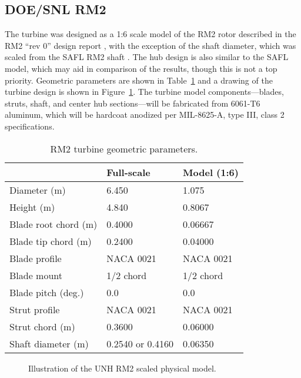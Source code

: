 \subsection{DOE/SNL RM2}

The turbine was designed as a 1:6 scale model of the RM2 rotor described in the
RM2 ``rev 0'' design report \cite{Barone2011}, with the exception of the shaft
diameter, which was scaled from the SAFL RM2 shaft \cite{Hill2014}. The hub
design is also similar to the SAFL model, which may aid in comparison of the
results, though this is not a top priority. Geometric parameters are shown in
Table~\ref{tab:turb-geom} and a drawing of the turbine design is shown in
Figure~\ref{fig:RM2-drawing}. The turbine model components---blades, struts,
shaft, and center hub sections---will be fabricated from 6061-T6 aluminum, which
will be hardcoat anodized per MIL-8625-A, type III, class 2 specifications.

\begin{table}[ht]
    \centering
    \begin{tabular}{l|l|l}
        & Full-scale & Model (1:6) \\
        \hline 
        Diameter (m)   & 6.450 & 1.075 \\ 
        Height (m)     & 4.840 & 0.8067 \\ 
        Blade root chord (m) & 0.4000 & 0.06667 \\ 
        Blade tip chord (m)  & 0.2400 & 0.04000 \\ 
        Blade profile & NACA 0021 & NACA 0021 \\ 
        Blade mount & 1/2 chord & 1/2 chord \\ 
        Blade pitch (deg.) & 0.0 & 0.0 \\ 
        Strut profile & NACA 0021 & NACA 0021 \\ 
        Strut chord (m) & 0.3600 & 0.06000 \\ 
        Shaft diameter (m) & 0.2540 \cite{Beam2011} or 0.4160 \cite{Hill2014} & 0.06350\\ 
    \end{tabular}
    \caption{RM2 turbine geometric parameters.}
    \label{tab:turb-geom}
\end{table}

\begin{figure}[ht]
    \centering
    \caption{Illustration of the UNH RM2 scaled physical model.}
    \label{fig:RM2-drawing}
\end{figure}


